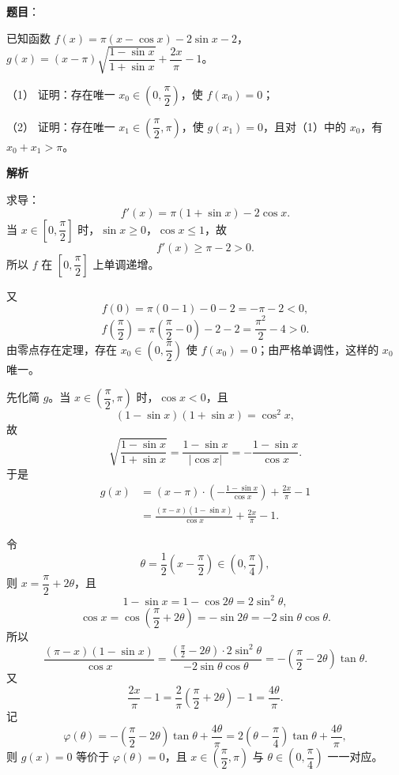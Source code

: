 \begin{answer}

\textbf{题目}：

已知函数 $f(x)=\pi(x-\cos x)-2\sin x-2$，$g(x)=(x-\pi)\sqrt{\dfrac{1-\sin x}{1+\sin x}}+\dfrac{2x}{\pi}-1$。

（1） 证明：存在唯一 $x_0\in\left(0,\dfrac\pi2\right)$，使 $f(x_0)=0$；

（2） 证明：存在唯一 $x_1\in\left(\dfrac\pi2,\pi\right)$，使 $g(x_1)=0$，且对（1）中的 $x_0$，有 $x_0+x_1>\pi$。

\textbf{解析}


求导：
\nopagebreak[4]
\[f'(x)=\pi(1+\sin x)-2\cos x.\]
当 $x\in\left[0,\dfrac\pi2\right]$ 时，$\sin x\geqslant0$，$\cos x\leqslant1$，故
\nopagebreak[4]
\[f'(x)\geqslant\pi-2>0.\]
所以 $f$ 在 $\left[0,\dfrac\pi2\right]$ 上单调递增。

又
\nopagebreak[4]
\[f(0)=\pi(0-1)-0-2=-\pi-2<0,\]
\nopagebreak[4]
\[f\left(\frac\pi2\right)=\pi\left(\frac\pi2-0\right)-2-2=\frac{\pi^2}2-4>0.\]
由零点存在定理，存在 $x_0\in\left(0,\dfrac\pi2\right)$ 使 $f(x_0)=0$；由严格单调性，这样的 $x_0$ 唯一。


先化简 $g$。当 $x\in\left(\dfrac\pi2,\pi\right)$ 时，$\cos x<0$，且
\nopagebreak[4]
\[(1-\sin x)(1+\sin x)=\cos^2x,\]
故
\nopagebreak[4]
\[\sqrt{\frac{1-\sin x}{1+\sin x}}=\frac{1-\sin x}{|\cos x|}=-\frac{1-\sin x}{\cos x}.\]
于是
\nopagebreak[4]
\[\begin{aligned}
g(x)&=(x-\pi)\cdot\left(-\frac{1-\sin x}{\cos x}\right)+\frac{2x}{\pi}-1\\
&=\frac{(\pi-x)(1-\sin x)}{\cos x}+\frac{2x}{\pi}-1.
\end{aligned}\]

令
\nopagebreak[4]
\[\theta=\frac12\left(x-\frac\pi2\right)\in\left(0,\frac\pi4\right),\]
则 $x=\dfrac\pi2+2\theta$，且
\nopagebreak[4]
\[1-\sin x=1-\cos2\theta=2\sin^2\theta,\]
\nopagebreak[4]
\[\cos x=\cos\left(\frac\pi2+2\theta\right)=-\sin2\theta=-2\sin\theta\cos\theta.\]
所以
\nopagebreak[4]
\[\frac{(\pi-x)(1-\sin x)}{\cos x}
=\frac{\left(\frac\pi2-2\theta\right)\cdot2\sin^2\theta}{-2\sin\theta\cos\theta}
=-\left(\frac\pi2-2\theta\right)\tan\theta.\]
又
\nopagebreak[4]
\[\frac{2x}{\pi}-1=\frac{2}{\pi}\left(\frac\pi2+2\theta\right)-1=\frac{4\theta}{\pi}.\]
记
\nopagebreak[4]
\[\varphi(\theta)=-\left(\frac\pi2-2\theta\right)\tan\theta+\frac{4\theta}{\pi}
=2\left(\theta-\frac\pi4\right)\tan\theta+\frac{4\theta}{\pi},\]
则 $g(x)=0$ 等价于 $\varphi(\theta)=0$，且 $x\in\left(\dfrac\pi2,\pi\right)$ 与 $\theta\in\left(0,\dfrac\pi4\right)$ 一一对应。


\end{answer}
